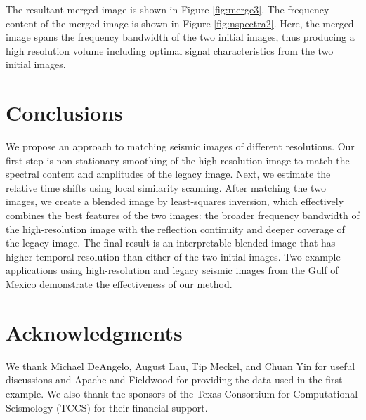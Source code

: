     The resultant merged image is shown in Figure \ref{fig:merge3}. 
    The frequency content of the merged image is shown in Figure \ref{fig:nspectra2}. 
    Here, the merged image spans the frequency bandwidth of the two initial images, thus producing a high resolution volume including optimal signal characteristics from the two initial images.
    
    
    

\section{Conclusions}
    
    We propose an approach to matching seismic images of different resolutions. 
    Our first step is non-stationary smoothing of the high-resolution image to match the spectral content and amplitudes of the legacy image. 
    Next, we estimate the relative time shifts using local similarity scanning. After matching the two images, we create a blended image by least-squares inversion, which effectively combines the best features of the two images: the broader frequency bandwidth of the high-resolution image with the reflection continuity and deeper coverage of the legacy image. 
    The final result is an interpretable blended image that has higher temporal resolution than either of the two initial images. 
    Two example applications using high-resolution and legacy seismic images from the Gulf of Mexico demonstrate the effectiveness of our method.
    
\section{Acknowledgments}

    We thank Michael DeAngelo, August Lau, Tip Meckel, and Chuan Yin for useful discussions and Apache and Fieldwood for providing the data used in the first example. 
    We also thank the sponsors of the Texas Consortium for Computational Seismology (TCCS) for their financial support. 

%
%
%

